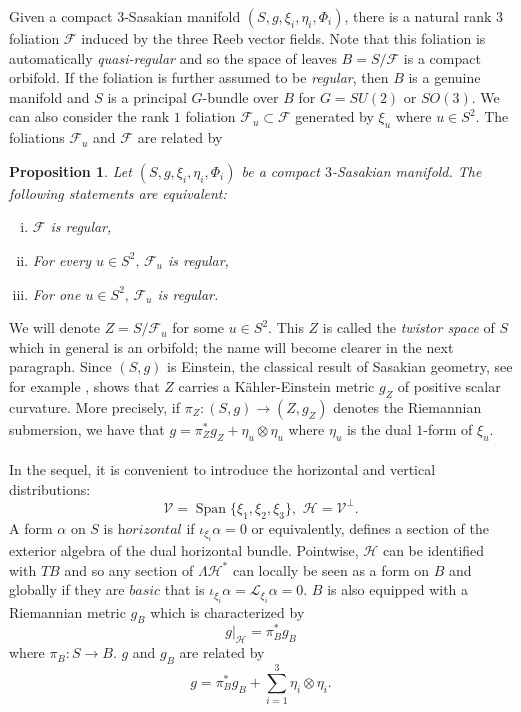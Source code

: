 \documentclass[12pt, reqno]{amsart}
\newtheorem{prop}[Def]{Proposition}
\theoremstyle{definition}
\DeclareMathOperator\Span{Span}
\newcommand{\F}{\mathcal{F}}
\newcommand{\cH}{\mathcal{H}}
\newcommand{\cV}{\mathcal{V}}
\newcommand{\lied}{\mathcal{L}}
\begin{document}
Given a compact $3$-Sasakian manifold $(S,g,\xi_i,\eta_i,\Phi_i)$, there is a natural rank $3$ foliation $\F$ induced by the three Reeb vector fields. Note that this foliation is automatically \textit{quasi-regular} and so the space of leaves $B=S/\F$ is a compact orbifold. If the foliation is further assumed to be \textit{regular}, then $B$ is a genuine manifold and $S$ is a principal $G$-bundle over $B$ for $G=SU(2)$ or $SO(3)$. We can also consider the rank $1$ foliation $\F_u\subset\F$ generated by $\xi_u$ where $u\in S^2$. The foliations $\F_u$ and $\F$ are related by
\begin{prop}\cite{Boyer:1998sf}
    Let $(S,g,\xi_i,\eta_i,\Phi_i)$ be a compact $3$-Sasakian manifold. The following statements are equivalent:
    \begin{enumerate}[(i)]
        \item $\F$ is regular,
        \item For every $u\in S^2,\,\F_u$ is regular,
        \item For one $u\in S^2,\,\F_u$ is regular.
    \end{enumerate}
\end{prop}
We will denote $Z=S/{\F_u}$ for some $u\in S^2$. This $Z$ is called the \textit{twistor space} of $S$ which in general is an orbifold; the name will become clearer in the next paragraph. Since $(S,g)$ is Einstein, the classical result of Sasakian geometry, see for example \cite[Theorem 2.1.2]{Boyer:1998sf}, shows that $Z$ carries a Kähler-Einstein metric $g_Z$ of positive scalar curvature. More precisely, if $\pi_Z : (S,g)\to (Z,g_Z)$ denotes the Riemannian submersion, we have that $g=\pi_Z^*g_Z+\eta_u\otimes\eta_u$ where $\eta_u$ is the dual $1$-form of $\xi_u$. \\ \\
\indent In the sequel, it is convenient to introduce the horizontal and vertical distributions:
$$\cV=\Span\{\xi_1,\xi_2,\xi_3\},\,\,\cH=\cV^\perp.$$ A form $\alpha$ on $S$ is $\textit{horizontal}$ if $\iota_{\xi_i}\alpha=0$ or equivalently, defines a section of the exterior algebra of the dual horizontal bundle. Pointwise, $\cH$ can be identified with $TB$ and so any section of $\Lambda\cH^*$ can locally be seen as a form on $B$ and globally if they are $\textit{basic}$ that is $\iota_{\xi_i}\alpha=\lied_{\xi_i}\alpha=0$. $B$ is also equipped with a Riemannian metric $g_B$ \cite{Boyer:1998sf} which is characterized by $$g|_{\cH}=\pi_B^*g_B$$ where $\pi_B : S\to B$. $g$ and $g_B$ are related by $$g=\pi^*_Bg_B+\sum_{i=1}^3 \eta_i\otimes\eta_i.$$ 
\end{document}
